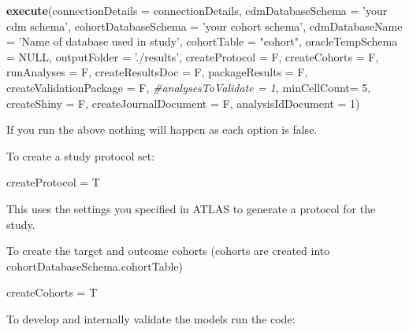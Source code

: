 \documentclass[]{article}
\newenvironment{Shaded}{\begin{snugshade}}{\end{snugshade}}
\newcommand{\KeywordTok}[1]{\textcolor[rgb]{0.13,0.29,0.53}{\textbf{#1}}}
\newcommand{\DataTypeTok}[1]{\textcolor[rgb]{0.13,0.29,0.53}{#1}}
\newcommand{\DecValTok}[1]{\textcolor[rgb]{0.00,0.00,0.81}{#1}}
\newcommand{\StringTok}[1]{\textcolor[rgb]{0.31,0.60,0.02}{#1}}
\newcommand{\CommentTok}[1]{\textcolor[rgb]{0.56,0.35,0.01}{\textit{#1}}}
\newcommand{\OtherTok}[1]{\textcolor[rgb]{0.56,0.35,0.01}{#1}}
\newcommand{\NormalTok}[1]{#1}
\begin{document}
\begin{Shaded}
\begin{Highlighting}[]
\KeywordTok{execute}\NormalTok{(}\DataTypeTok{connectionDetails =}\NormalTok{ connectionDetails,}
        \DataTypeTok{cdmDatabaseSchema =} \StringTok{'your cdm schema'}\NormalTok{,}
        \DataTypeTok{cohortDatabaseSchema =} \StringTok{'your cohort schema'}\NormalTok{,}
        \DataTypeTok{cdmDatabaseName =} \StringTok{'Name of database used in study'}\NormalTok{,}
        \DataTypeTok{cohortTable =} \StringTok{"cohort"}\NormalTok{,}
        \DataTypeTok{oracleTempSchema =} \OtherTok{NULL}\NormalTok{,}
        \DataTypeTok{outputFolder =} \StringTok{'./results'}\NormalTok{,}
        \DataTypeTok{createProtocol =}\NormalTok{ F,}
        \DataTypeTok{createCohorts =}\NormalTok{ F,}
        \DataTypeTok{runAnalyses =}\NormalTok{ F,}
        \DataTypeTok{createResultsDoc =}\NormalTok{ F,}
        \DataTypeTok{packageResults =}\NormalTok{ F,}
        \DataTypeTok{createValidationPackage =}\NormalTok{ F,  }
        \CommentTok{#analysesToValidate = 1,}
        \DataTypeTok{minCellCount=} \DecValTok{5}\NormalTok{,}
        \DataTypeTok{createShiny =}\NormalTok{ F,}
        \DataTypeTok{createJournalDocument =}\NormalTok{ F,}
        \DataTypeTok{analysisIdDocument =} \DecValTok{1}\NormalTok{)}
\end{Highlighting}
\end{Shaded}

If you run the above nothing will happen as each option is false.

To create a study protocol set:

\begin{Shaded}
\begin{Highlighting}[]
\NormalTok{    createProtocol =}\StringTok{ }\NormalTok{T}
\end{Highlighting}
\end{Shaded}

This uses the settings you specified in ATLAS to generate a protocol for
the study.

To create the target and outcome cohorts (cohorts are created into
cohortDatabaseSchema.cohortTable)

\begin{Shaded}
\begin{Highlighting}[]
\NormalTok{    createCohorts =}\StringTok{ }\NormalTok{T}
\end{Highlighting}
\end{Shaded}

To develop and internally validate the models run the code:
\end{document}
